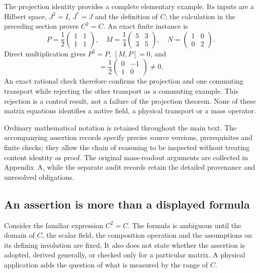 \documentclass[11pt,a4paper]{article}
\begin{document}
The projection identity provides a complete elementary example. Its
inputs are a Hilbert space, $J^2=I$, $J^*=J$ and the definition of $C$;
the calculation in the preceding section proves $C^2=C$. An exact
finite instance is
\begin{equation}
 P=\frac12\begin{pmatrix}1&1\\1&1\end{pmatrix},\quad
 M=\frac14\begin{pmatrix}5&3\\3&5\end{pmatrix},\quad
 N=\begin{pmatrix}1&0\\0&2\end{pmatrix}.
\end{equation}
Direct multiplication gives $P^2=P$, $[M,P]=0$, and
\begin{equation}
 [N,P]=\frac12\begin{pmatrix}0&-1\\1&0\end{pmatrix}\ne0.
\end{equation}
An exact rational check therefore confirms the projection and one
commuting transport while rejecting the other transport as a commuting
example. This rejection is a control result, not a failure of the
projection theorem. None of these matrix equations identifies a native
field, a physical transport or a mass operator.

Ordinary mathematical notation is retained throughout the main text.
The accompanying assertion records specify precise source versions,
prerequisites and finite checks; they allow the chain of reasoning to
be inspected without treating content identity as proof. The original
mass-readout arguments are collected in Appendix~A, while the separate
audit records retain the detailed provenance and unresolved obligations.
\subsection{An assertion is more than a displayed formula}
Consider the familiar expression $C^2=C$. The formula is ambiguous
until the domain of $C$, the scalar field, the composition operation
and the assumptions on its defining involution are fixed. It also
does not state whether the assertion is adopted, derived generally,
or checked only for a particular matrix. A physical application adds
the question of what is measured by the range of $C$.
\end{document}
